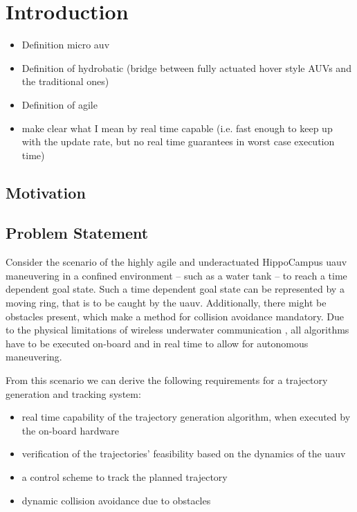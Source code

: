 \chapter{Introduction}
\begin{itemize}
    \color{red}
    \item Definition micro auv \cite{micro-auv}
    \item Definition of hydrobatic \cite{hydrobatic} (bridge between fully actuated hover style AUVs and the traditional ones)
    \item Definition of agile \cite{duecker-phd}
    \item make clear what I mean by real time capable (i.e. fast enough to keep up with the update rate, but no real time guarantees in worst case execution time)
\end{itemize}
\section{Motivation}

\section{Problem Statement}
Consider the scenario of the highly agile and underactuated HippoCampus \ac{uauv} maneuvering in a confined environment -- such as a water tank -- to reach a time dependent goal state.
Such a time dependent goal state can be represented by a moving ring, that is to be caught by the \ac{uauv}.
Additionally, there might be obstacles present, which make a method for collision avoidance mandatory.
Due to the physical limitations of wireless underwater communication \cite{Bettale08p1,GeistEtAl16}, all algorithms have to be executed on-board and in real time to allow for autonomous maneuvering.

From this scenario we can derive the following requirements for a trajectory generation and tracking system:

\begin{itemize}
    \item real time capability of the trajectory generation algorithm, when executed by the on-board hardware
    \item verification of the trajectories' feasibility based on the dynamics of the \ac{uauv}
    \item a control scheme to track the planned trajectory
    \item dynamic collision avoidance due to obstacles
\end{itemize}

